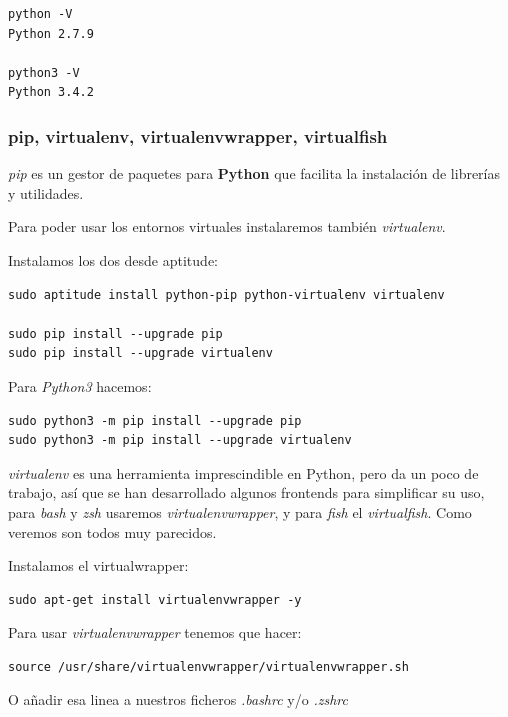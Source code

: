 \documentclass[12pt,spanish,]{scrartcl}
\begin{document}
\begin{verbatim}
python -V
Python 2.7.9

python3 -V
Python 3.4.2
\end{verbatim}

\hypertarget{pip-virtualenv-virtualenvwrapper-virtualfish}{%
\subsubsection{pip, virtualenv, virtualenvwrapper,
virtualfish}\label{pip-virtualenv-virtualenvwrapper-virtualfish}}

\emph{pip} es un gestor de paquetes para \textbf{Python} que facilita la
instalación de librerías y utilidades.

Para poder usar los entornos virtuales instalaremos también
\emph{virtualenv}.

Instalamos los dos desde aptitude:

\begin{verbatim}
sudo aptitude install python-pip python-virtualenv virtualenv

sudo pip install --upgrade pip
sudo pip install --upgrade virtualenv
\end{verbatim}

Para \emph{Python3} hacemos:

\begin{verbatim}
sudo python3 -m pip install --upgrade pip
sudo python3 -m pip install --upgrade virtualenv
\end{verbatim}

\emph{virtualenv} es una herramienta imprescindible en Python, pero da
un poco de trabajo, así que se han desarrollado algunos frontends para
simplificar su uso, para \emph{bash} y \emph{zsh} usaremos
\emph{virtualenvwrapper}, y para \emph{fish} el \emph{virtualfish}. Como
veremos son todos muy parecidos.

Instalamos el virtualwrapper:

\begin{verbatim}
sudo apt-get install virtualenvwrapper -y
\end{verbatim}

Para usar \emph{virtualenvwrapper} tenemos que hacer:

\begin{verbatim}
source /usr/share/virtualenvwrapper/virtualenvwrapper.sh
\end{verbatim}

O añadir esa linea a nuestros ficheros \emph{.bashrc} y/o \emph{.zshrc}
\end{document}
